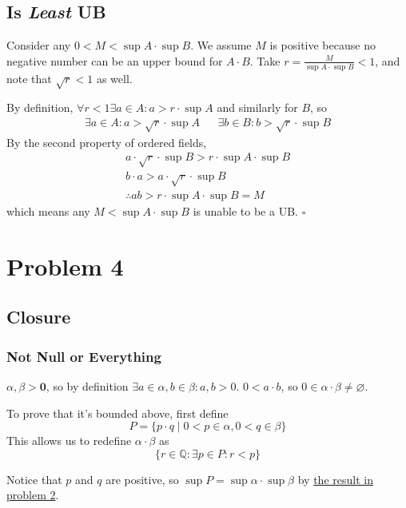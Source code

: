 \documentclass[12pt]{article}
\newcommand{\Q}{\mathbb{Q}}
\begin{document}
\subsection{Is \textit{Least} UB}

Consider any $0 < M < \sup A \cdot \sup B$.
We assume $M$ is positive because no negative number can be an upper bound for $A \cdot B$.
Take $r=\frac{M}{\sup A \cdot \sup B} < 1$, and note that $\sqrt{r} < 1$ as well.

By definition, $\forall r < 1 \exists a \in A: a > r \cdot \sup A$ and similarly for $B$, so
\begin{align*}
  \exists a \in A: a > \sqrt{r} \cdot \sup A &  &
  \exists b \in B: b > \sqrt{r} \cdot \sup B
\end{align*}
By the second property of ordered fields,
\begin{gather*}
  a \cdot \sqrt{r} \cdot \sup B > r \cdot \sup A \cdot \sup B \\
  b \cdot a > a \cdot \sqrt{r} \cdot \sup B \\
  \therefore ab > r \cdot \sup A \cdot \sup B = M
\end{gather*}
which means any $M < \sup A \cdot \sup B$ is unable to be a UB. $\square$

\pagebreak

\section{Problem 4}

\subsection{Closure}

\subsubsection{Not Null or Everything}

$\alpha, \beta > \mathbf{0}$, so by definition $\exists a \in \alpha, b \in \beta: a, b > 0$.
$0 < a \cdot b$, so $0 \in \alpha \cdot \beta \ne \varnothing$.

To prove that it's bounded above, first define
\[P=\{p \cdot q \mid 0 < p \in \alpha, 0 < q \in \beta\}\]
This allows us to redefine $\alpha \cdot \beta$ as
\[\{r \in \Q: \exists p \in P: r < p\}\]

Notice that $p$ and $q$ are positive, so $\sup P=\sup \alpha \cdot \sup \beta$
by \hyperref[sec:prob2]{the result in problem 2}.
\end{document}
